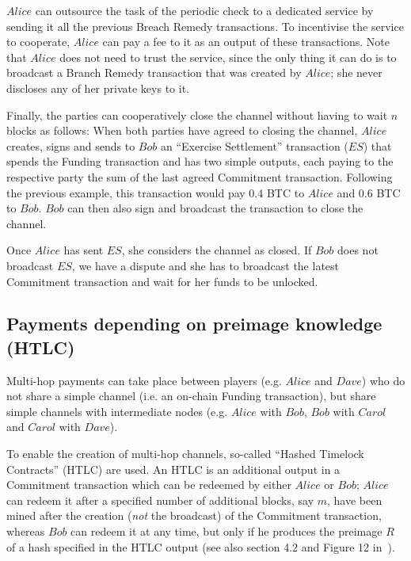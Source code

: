     $Alice$ can outsource the task of the periodic check to a dedicated service by sending
    it all the previous Breach Remedy transactions. To incentivise the service to
    cooperate, $Alice$ can pay a fee to it as an output of these transactions. Note that
    $Alice$ does not need to trust the service, since the only thing it can do is to
    broadcast a Branch Remedy transaction that was created by $Alice$; she never discloses
    any of her private keys to it.

    Finally, the parties can cooperatively close the channel without having to wait $n$
    blocks as follows: When both parties have agreed to closing the channel, $Alice$
    creates, signs and sends to $Bob$ an ``Exercise Settlement'' transaction ($ES$) that
    spends the Funding transaction and has two simple outputs, each paying to the
    respective party the sum of the last agreed Commitment transaction. Following the
    previous example, this transaction would pay 0.4 BTC to $Alice$ and 0.6 BTC to $Bob$.
    $Bob$ can then also sign and broadcast the transaction to close the channel.

    Once $Alice$ has sent $ES$, she considers the channel as closed. If $Bob$ does not
    broadcast $ES$, we have a dispute and she has to broadcast the latest Commitment
    transaction and wait for her funds to be unlocked.

  \subsection{Payments depending on preimage knowledge (HTLC)}
    Multi-hop payments can take place between players (e.g. $Alice$ and $Dave$) who do not
    share a simple channel (i.e. an on-chain Funding transaction), but share simple
    channels with intermediate nodes (e.g. $Alice$ with $Bob$, $Bob$ with $Carol$ and
    $Carol$ with $Dave$).

    To enable the creation of multi-hop channels, so-called ``Hashed Timelock Contracts''
    (HTLC) are used. An HTLC is an additional output in a Commitment transaction which can
    be redeemed by either $Alice$ or $Bob$; $Alice$ can redeem it after a specified number
    of additional blocks, say $m$, have been mined after the creation (\textit{not} the
    broadcast) of the Commitment transaction, whereas $Bob$ can redeem it at any time, but
    only if he produces the preimage $R$ of a hash specified in the HTLC output (see also
    section 4.2 and Figure 12 in~\cite{lightning}).

